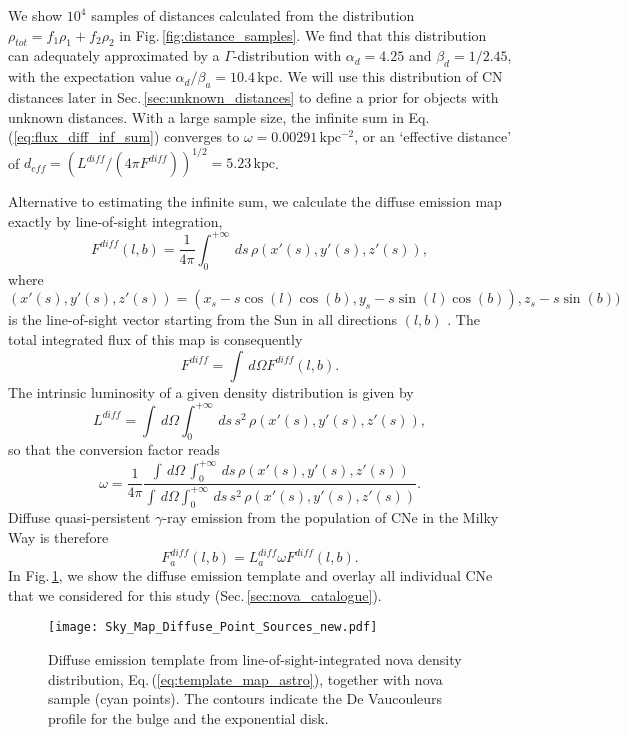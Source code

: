 \documentclass{aa}
\newcommand{\mrm}[1]{\mathrm{#1}}
\begin{document}
%
We show $10^4$ samples of distances calculated from the distribution $\rho_{tot} = f_1\rho_1 + f_2\rho_2$ in Fig.\,\ref{fig:distance_samples}.
%
We find that this distribution can adequately approximated by a $\Gamma$-distribution with $\alpha_d = 4.25$ and $\beta_d = 1/2.45$, with the expectation value $\alpha_d/\beta_a = 10.4$\,kpc.
%
We will use this distribution of CN distances later in Sec.\,\ref{sec:unknown_distances} to define a prior for objects with unknown distances.
%
With a large sample size, the infinite sum in Eq.\,(\ref{eq:flux_diff_inf_sum}) converges to $\omega = 0.00291\,\mrm{kpc^{-2}}$, or an `effective distance' of $d_{eff} = (L^{diff}/(4 \pi F^{diff}))^{1/2} = 5.23\,\mrm{kpc}$.

Alternative to estimating the infinite sum, we calculate the diffuse emission map exactly by line-of-sight integration,
%
\begin{equation}
	F^{diff}(l,b) = \frac{1}{4 \pi} \int_0^{+\infty}\,ds\,\rho(x'(s),y'(s),z'(s))\mrm{,}
\end{equation}
%
where $(x'(s),y'(s),z'(s)) = (x_s-s\cos(l)\cos(b), y_s-s\sin(l)\cos(b)), z_s-s\sin(b))$ is the line-of-sight vector starting from the Sun in all directions $(l,b)$ \citep[c.f. also][]{Erwin2015_IMFIT}.
%
The total integrated flux of this map is consequently
%
\begin{equation}
	F^{diff} = \int\,d\Omega F^{diff}(l,b)\mrm{.}
\end{equation}
%
The intrinsic luminosity of a given density distribution is given by
%
\begin{equation}
	L^{diff} = \int\,d\Omega \int_0^{+\infty}\,ds\,s^2\,\rho(x'(s),y'(s),z'(s))\mrm{,}
\end{equation}
%
so that the conversion factor reads
%
\begin{equation}
	\omega = \frac{1}{4 \pi}\frac{\int\,d\Omega\,\int_0^{+\infty}\,ds\,\rho(x'(s),y'(s),z'(s))}{\int\,d\Omega \int_0^{+\infty}\,ds\,s^2\,\rho(x'(s),y'(s),z'(s))}\mrm{.}
\end{equation}
%
Diffuse quasi-persistent $\gamma$-ray emission from the population of CNe in the Milky Way is therefore
%
\begin{equation}
	F_a^{diff}(l,b) = L_a^{diff} \omega F^{diff}(l,b)\mrm{.}
	\label{eq:template_map_astro}
\end{equation}
%
In Fig.\,\ref{fig:diffuse_map_plus_sources}, we show the diffuse emission template and overlay all individual CNe that we considered for this study (Sec.\,\ref{sec:nova_catalogue}).
%
\begin{figure}[!htbp]
	\centering
	\texttt{[image: Sky\_Map\_Diffuse\_Point\_Sources\_new.pdf]}
	\caption{Diffuse emission template from line-of-sight-integrated nova density distribution, Eq.\,(\ref{eq:template_map_astro}), together with nova sample (cyan points). The contours indicate the De Vaucouleurs profile for the bulge and the exponential disk.}
	\label{fig:diffuse_map_plus_sources}
\end{figure}
\end{document}
